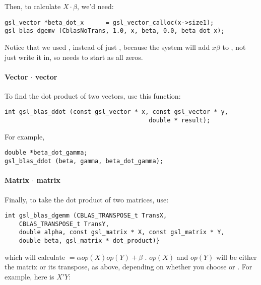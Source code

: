 Then, to calculate $X\cdot \beta$, we'd need:

\begin{lstlisting}
gsl_vector *beta_dot_x      = gsl_vector_calloc(x->size1);
gsl_blas_dgemv (CblasNoTrans, 1.0, x, beta, 0.0, beta_dot_x);
\end{lstlisting}

Notice that we used , instead of just , because
the system will add $x\beta$ to , not just write it in,
so  needs to start as all zeros.

\paragraph{Vector $\cdot$ vector}
To find the dot product of two vectors, use this function:
\begin{lstlisting}
int gsl_blas_ddot (const gsl_vector * x, const gsl_vector * y, 
                                        double * result);
\end{lstlisting}

For example,

\begin{lstlisting}
double *beta_dot_gamma;
gsl_blas_ddot (beta, gamma, beta_dot_gamma);
\end{lstlisting}

\paragraph{Matrix $\cdot$ matrix}
Finally, to take the dot product of two matrices, use:
\begin{lstlisting}
int gsl_blas_dgemm (CBLAS_TRANSPOSE_t TransX, 
    CBLAS_TRANSPOSE_t TransY, 
    double alpha, const gsl_matrix * X, const gsl_matrix * Y, 
    double beta, gsl_matrix * dot_product)}
\end{lstlisting}

which will calculate  $= \alpha op(X) op(Y) + \beta$ . $op(X)$ and
$op(Y)$ will be either the matrix or its transpose, as above, depending on whether you choose 
or . For example, here is $X'Y$:

